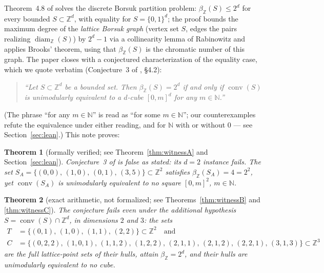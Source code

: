 \documentclass[11pt]{article}
\newtheorem{theorem}{Theorem}[section]
\theoremstyle{remark}
\newcommand{\Z}{\mathbb{Z}}
\newcommand{\N}{\mathbb{N}}
\newcommand{\conv}{\operatorname{conv}}
\newcommand{\diamZ}{\operatorname{diam}_{\Z}}
\newcommand{\betaZ}{\beta_{\Z}}
\begin{document}
Theorem~4.8 of \cite{BDLT2025} solves the discrete Borsuk partition problem:
$\betaZ(S) \le 2^d$ for every bounded $S \subset \Z^d$, with equality for
$S = \{0,1\}^d$; the proof bounds the maximum degree of the \emph{lattice
Borsuk graph} (vertex set $S$, edges the pairs realizing $\diamZ(S)$) by
$2^d - 1$ via a collinearity lemma of Rabinowitz \cite{Rabinowitz1989} and
applies Brooks' theorem, using that $\betaZ(S)$ is the chromatic number of
this graph. The paper closes with a conjectured characterization of the
equality case, which we quote verbatim (Conjecture~3 of \cite{BDLT2025},
\S 4.2):

\begin{quote}
\emph{``Let $S \subset \Z^d$ be a bounded set. Then $\betaZ(S) = 2^d$ if and
only if $\conv(S)$ is unimodularly equivalent to a $d$-cube $[0,m]^d$ for any
$m \in \N$.''}
\end{quote}

\noindent
(The phrase ``for any $m \in \N$'' is read as ``for some $m \in \N$''; our
counterexamples refute the equivalence under either reading, and for $\N$
with or without $0$ --- see Section~\ref{sec:lean}.) This note proves:

\begin{theorem}[formally verified; see Theorem~\ref{thm:witnessA} and
Section~\ref{sec:lean}]\label{thm:main}
Conjecture~3 of \cite{BDLT2025} is false as stated: its $d=2$ instance fails.
The set $S_A = \{(0,0),\,(1,0),\,(0,1),\,(3,5)\} \subset \Z^2$ satisfies
$\betaZ(S_A) = 4 = 2^2$, yet $\conv(S_A)$ is unimodularly equivalent to no
square $[0,m]^2$, $m \in \N$.
\end{theorem}

\begin{theorem}[exact arithmetic, not formalized; see
Theorems~\ref{thm:witnessB} and \ref{thm:witnessC}]\label{thm:repair}
The conjecture fails even under the additional hypothesis
$S = \conv(S) \cap \Z^d$, in dimensions $2$ and $3$: the sets
\begin{align*}
T &= \{(0,1),\,(1,0),\,(1,1),\,(2,2)\} \subset \Z^2 \quad\text{and}\\
C &= \{(0,2,2),\,(1,0,1),\,(1,1,2),\,(1,2,2),\,(2,1,1),\,(2,1,2),\,(2,2,1),
\,(3,1,3)\} \subset \Z^3
\end{align*}
are the full lattice-point sets of their hulls, attain
$\betaZ = 2^d$, and their hulls are unimodularly equivalent to no cube.
\end{theorem}
\end{document}
